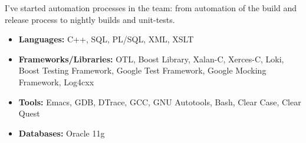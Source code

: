 I've started automation processes in the team: from automation of the build and release process to nightly builds and unit-tests.

\begin{itemize}[noitemsep, nosep]
  \item \textbf{Languages:} C++, SQL, PL/SQL, XML, XSLT
  \item \textbf{Frameworks/Libraries:} OTL, Boost Library, Xalan-C, Xerces-C, Loki, Boost Testing Framework, Google Test Framework,
  Google Mocking Framework, Log4cxx
  \item \textbf{Tools:} Emacs, GDB, DTrace, GCC, GNU Autotools, Bash, Clear Case, Clear Quest
  \item \textbf{Databases:} Oracle 11g
\end{itemize}
